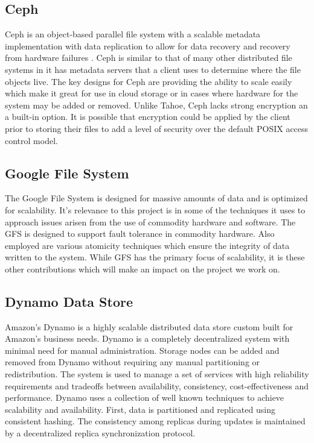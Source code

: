 \documentclass[11pt]{article}
\begin{document}
\subsection{Ceph}
Ceph is an object-based parallel file system with a scalable metadata
implementation with data replication to allow for data recovery and
recovery from hardware failures
\cite{Weil:2012p1035,Weil:2012p1010,Weil:2006p1273}.
Ceph is similar to that of many other
distributed file systems in it has metadata servers that a client uses
to determine where the file objects live. The key designs for Ceph are
providing the ability to scale easily which make it great for use in
cloud storage or in cases where hardware for the system may be added
or removed. Unlike Tahoe, Ceph lacks strong encryption an a built-in
option. It is
possible that encryption could be applied by the client prior to
storing their files to add a level of security over the default POSIX
access control model.

\subsection{Google File System}
The Google File System is designed for massive amounts of data and is 
optimized for scalability. It's relevance to this project is in some 
of the techniques it uses to approach issues arisen from the use of 
commodity hardware and software. The GFS is designed to support fault
tolerance in commodity hardware. Also employed are various atomicity
techniques which ensure the integrity of data written to the system.
While GFS has the primary focus of scalability, it is these other 
contributions which will make an impact on the project we work on.

\subsection{Dynamo Data Store}
Amazon's Dynamo is a highly scalable distributed data store custom
built for Amazon’s business needs. Dynamo is a completely
decentralized system with minimal need for manual
administration. Storage nodes can be added and removed from Dynamo
without requiring any manual partitioning or redistribution. The
system is used to manage a set of services with high reliability
requirements and tradeoffs between availability, consistency,
cost-effectiveness and performance. Dynamo uses a collection of well
known techniques to achieve scalability and availability. First, data
is partitioned and replicated using consistent hashing. The
consistency among replicas during updates is maintained by a
decentralized replica synchronization protocol.
\end{document}
